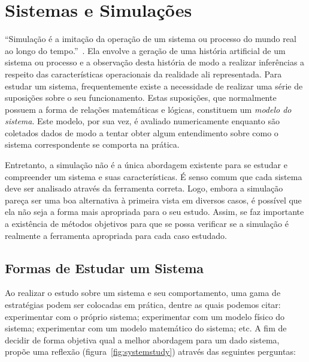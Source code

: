 \chapter{\label{chap:simulation}Sistemas e Simulações}

``Simulação é a imitação da operação de um sistema ou processo do mundo real ao
longo do tempo.''~\cite{Banks}. Ela envolve a geração de uma história artificial
de um sistema ou processo e a observação desta história de modo a realizar
inferências a respeito das características operacionais da realidade ali
representada. Para estudar um sistema, frequentemente existe a necessidade de
realizar uma série de suposições sobre o seu funcionamento. Estas suposições,
que normalmente possuem a forma de relações matemáticas e lógicas, constituem um
\textit{modelo do sistema}. Este modelo, por sua vez, é avaliado numericamente
enquanto são coletados dados de modo a tentar obter algum entendimento sobre
como o sistema correspondente se comporta na prática.

Entretanto, a simulação não é a única abordagem existente para se estudar e
compreender um sistema e suas características. É senso comum que cada sistema
deve ser analisado através da ferramenta correta. Logo, embora a simulação
pareça ser uma boa alternativa à primeira vista em diversos casos, é possível
que ela não seja a forma mais apropriada para o seu estudo. Assim, se faz
importante a existência de métodos objetivos para que se possa verificar se a
simulação é realmente a ferramenta apropriada para cada caso estudado.

\section{\label{chap:waystostudy}Formas de Estudar um Sistema}

Ao realizar o estudo sobre um sistema e seu comportamento, uma gama de
estratégias podem ser colocadas em prática, dentre as quais podemos citar:
experimentar com o próprio sistema; experimentar com um modelo físico do
sistema; experimentar com um modelo matemático do sistema; etc. A fim de decidir
de forma objetiva qual a melhor abordagem para um dado sistema,~\cite{Law}
propõe uma reflexão (figura~\ref{fig:systemstudy}) através das seguintes
perguntas:

